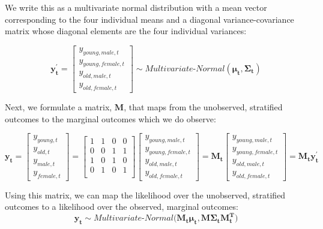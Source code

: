 \documentclass{article}
\begin{document}
We write this as a multivariate normal distribution with a mean vector corresponding to the four individual means and a diagonal variance-covariance matrix whose diagonal elements are the four individual variances:

\begin{equation}
	\bm{y_t^\prime} = 
	\begin{bmatrix}
	y_{young,male,t} \\ y_{young,female,t} \\ y_{old,male,t} \\ y_{old,female,t}
	\end{bmatrix} \sim Multivariate\text{-}Normal(\bm{\mu_t}, \bm{\Sigma_t})
\end{equation}

Next, we formulate a matrix, $\bm{M}$, that maps from the unobserved, stratified outcomes to the marginal outcomes which we do observe:

\begin{equation}
	\bm{y_t} = \begin{bmatrix}
		y_{young,t} \\ y_{old,t} \\ y_{male,t} \\ y_{female,t}
	\end{bmatrix} =
	\begin{bmatrix}
	1 & 1 & 0 & 0 \\
	0 & 0 & 1 & 1 \\
	1 & 0 & 1 & 0 \\
	0 & 1 & 0 & 1 \\
	\end{bmatrix}
	\begin{bmatrix}
	y_{young,male,t} \\ y_{young,female,t} \\ y_{old,male,t} \\ y_{old,female,t}
	\end{bmatrix} =
	\bm{M_t} \begin{bmatrix}
	y_{young,male,t} \\ y_{young,female,t} \\ y_{old,male,t} \\ y_{old,female,t}
	\end{bmatrix} =
	\bm{M_t} \bm{y_t^\prime}
\end{equation}

Using this matrix, we can map the likelihood over the unobserved, stratified outcomes to a likelihood over the observed, marginal outcomes:
\begin{equation}
	\bm{y_t} \sim Multivariate\text{-}Normal\big(\bm{M_t \mu_t}, \bm{M \Sigma_t M_t^T}\big)
\end{equation}
\end{document}

